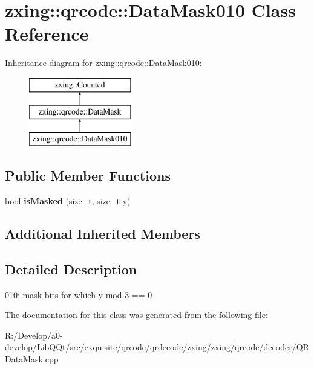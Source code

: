\hypertarget{classzxing_1_1qrcode_1_1_data_mask010}{}\section{zxing\+:\+:qrcode\+:\+:Data\+Mask010 Class Reference}
\label{classzxing_1_1qrcode_1_1_data_mask010}
Inheritance diagram for zxing\+:\+:qrcode\+:\+:Data\+Mask010\+:\begin{figure}[H]
\begin{center}
\leavevmode
\includegraphics[height=3.000000cm]{classzxing_1_1qrcode_1_1_data_mask010}
\end{center}
\end{figure}
\subsection*{Public Member Functions}
\begin{DoxyCompactItemize}
\item 
\mbox{\label{classzxing_1_1qrcode_1_1_data_mask010_a01ab5835c1ce1d1bc8ca58a263815dbb}} 
bool {\bfseries is\+Masked} (size\+\_\+t, size\+\_\+t y)
\end{DoxyCompactItemize}
\subsection*{Additional Inherited Members}


\subsection{Detailed Description}
010\+: mask bits for which y mod 3 == 0 

The documentation for this class was generated from the following file\+:\begin{DoxyCompactItemize}
\item 
R\+:/\+Develop/a0-\/develop/\+Lib\+Q\+Qt/src/exquisite/qrcode/qrdecode/zxing/zxing/qrcode/decoder/Q\+R\+Data\+Mask.\+cpp\end{DoxyCompactItemize}
